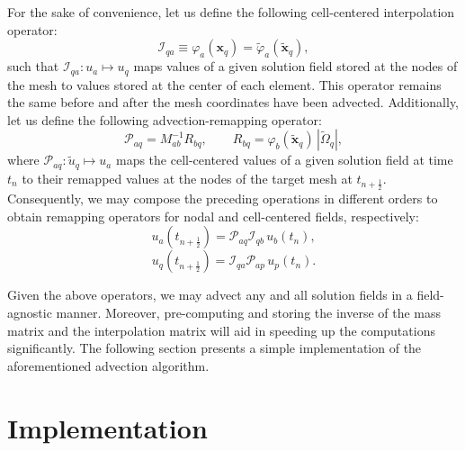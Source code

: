 \documentclass[12pt]{article}
\begin{document}
For the sake of convenience, let us define the following cell-centered interpolation operator:
\begin{equation}
  \mathcal{I}_{qa} \equiv \varphi_a (\mathbf{x}_q) = \tilde{\varphi}_a (\tilde{\mathbf{x}}_q),
  \label{eq:interpolation}
\end{equation}
such that $\mathcal{I}_{qa} : u_a \mapsto u_q$ maps values of a given solution field stored at the nodes of the mesh to values stored at the center of each element. This operator remains the same before and after the mesh coordinates have been advected. Additionally, let us define the following advection-remapping operator:
\begin{equation}
  \mathcal{P}_{aq} = M^{-1}_{ab} R_{bq}, \qquad R_{bq} = \varphi_b (\tilde{\mathbf{x}}_q) \, |\tilde{\Omega}_q|,
  \label{eq:projection}
\end{equation}
where $\mathcal{P}_{aq} : \tilde{u}_q \mapsto u_a$ maps the cell-centered values of a given solution field at time $t_n$ to their remapped values at the nodes of the target mesh at $t_{n+\frac{1}{2}}$. Consequently, we may compose the preceding operations in different orders to obtain remapping operators for nodal and cell-centered fields, respectively:
\begin{equation}
  u_a (t_{n+\frac{1}{2}}) = \mathcal{P}_{aq} \mathcal{I}_{qb} \, u_b (t_n),
  \label{eq:advect_node}
\end{equation}
\begin{equation}
  u_q (t_{n+\frac{1}{2}}) =  \mathcal{I}_{qa} \mathcal{P}_{ap} \, u_p (t_n).
  \label{eq:advect_cell}
\end{equation}

Given the above operators, we may advect any and all solution fields in a field-agnostic manner. Moreover, pre-computing and storing the inverse of the mass matrix and the interpolation matrix will aid in speeding up the computations significantly. The following section presents a simple implementation of the aforementioned advection algorithm.


\section{Implementation}
\end{document}
